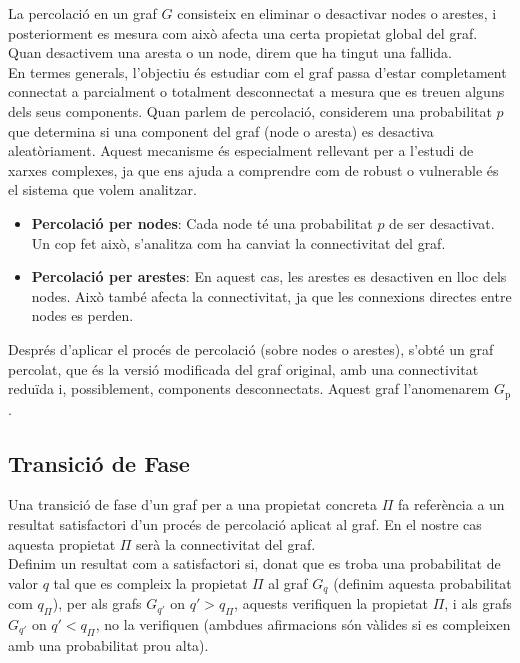 \documentclass[a4paper]{article}
\begin{document}
	La percolació en un graf $G$ consisteix en eliminar o desactivar nodes o arestes, i posteriorment es mesura com això afecta una certa propietat global del graf. Quan desactivem una aresta o un node, direm que ha tingut una fallida. \\
	
	En termes generals, l'objectiu és estudiar com el graf passa d'estar completament connectat a parcialment o totalment desconnectat a mesura que es treuen alguns dels seus components. Quan parlem de percolació, considerem una probabilitat $p$ que determina si una component del graf (node o aresta) es desactiva aleatòriament. Aquest mecanisme és especialment rellevant per a l'estudi de xarxes complexes, ja que ens ajuda a comprendre com de robust o vulnerable és el sistema que volem analitzar.
	
	\begin{itemize}
		\item \textbf{Percolació per nodes}: Cada node té una probabilitat $p$ de ser desactivat. Un cop fet això, s'analitza com ha canviat la connectivitat del graf.
		\item \textbf{Percolació per arestes}: En aquest cas, les arestes es desactiven en lloc dels nodes. Això també afecta la connectivitat, ja que les connexions directes entre nodes es perden.
	\end{itemize}
	
	Després d'aplicar el procés de percolació (sobre nodes o arestes), s'obté un graf percolat, que és la versió modificada del graf original, amb una connectivitat reduïda i, possiblement, components desconnectats. Aquest graf l'anomenarem $G_{\text{p}}$.
	
	\subsection{Transició de Fase}
	
	Una transició de fase d'un graf per a una propietat concreta $\Pi$ fa referència a un resultat satisfactori d'un procés de percolació aplicat al graf. En el nostre cas aquesta propietat $\Pi$ serà la connectivitat del graf. \\
	
	Definim un resultat com a satisfactori si, donat que es troba una probabilitat de valor $q$ tal que es compleix la propietat $\Pi$ al graf $G_q$ (definim aquesta probabilitat com $q_{\Pi}$), per als grafs $G_{q'}$ on $q' > q_{\Pi}$, aquests verifiquen la propietat $\Pi$, i als grafs $G_{q'}$ on $q' < q_{\Pi}$, no la verifiquen (ambdues afirmacions són vàlides si es compleixen amb una probabilitat prou alta). \\
	
\end{document}
